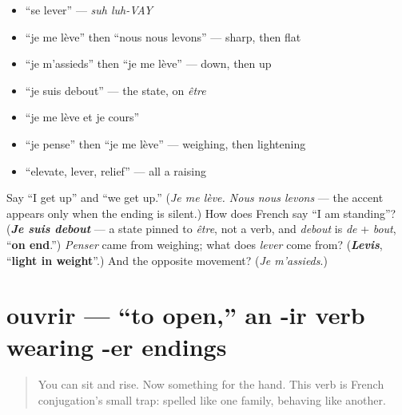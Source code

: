 \begin{itemize}
\raggedright
  \item \textquotedblleft{}se lever\textquotedblright{} — \emph{suh luh-VAY}
  \item \textquotedblleft{}je me lève\textquotedblright{} then \textquotedblleft{}nous nous levons\textquotedblright{} — sharp, then flat
  \item \textquotedblleft{}je m'assieds\textquotedblright{} then \textquotedblleft{}je me lève\textquotedblright{} — down, then up
  \item \textquotedblleft{}je suis debout\textquotedblright{} — the state, on \emph{être}
  \item \textquotedblleft{}je me lève et je cours\textquotedblright{}
  \item \textquotedblleft{}je pense\textquotedblright{} then \textquotedblleft{}je me lève\textquotedblright{} — weighing, then lightening
  \item \textquotedblleft{}elevate, lever, relief\textquotedblright{} — all a raising
\end{itemize}

\begin{tcolorbox}[breakable,colback=teal!4,colframe=teal!35!black,title={Before you move on}]
Say \textquotedblleft{}I get up\textquotedblright{} and \textquotedblleft{}we get up.\textquotedblright{} (\emph{Je me lève. Nous nous levons} — the accent appears only when the ending is silent.) How does French say \textquotedblleft{}I am standing\textquotedblright{}? (\emph{\textbf{Je suis debout}} — a state pinned to \emph{être}, not a verb, and \emph{debout} is \emph{de} + \emph{bout}, \textquotedblleft{}\textbf{on end}.\textquotedblright{}) \emph{Penser} came from weighing; what does \emph{lever} come from? (\emph{\textbf{Levis}}, \textquotedblleft{}\textbf{light in weight}\textquotedblright{}.) And the opposite movement? (\emph{Je m'assieds}.)
\end{tcolorbox}
\section[ouvrir]{ouvrir — \textquotedblleft{}to open,\textquotedblright{} an -ir verb wearing -er endings}

\label{lesson:FR-C27-ouvrir}



\begin{quote}
You can sit and rise. Now something for the hand. This verb is French conjugation's small trap: spelled like one family, behaving like another.
\end{quote}

